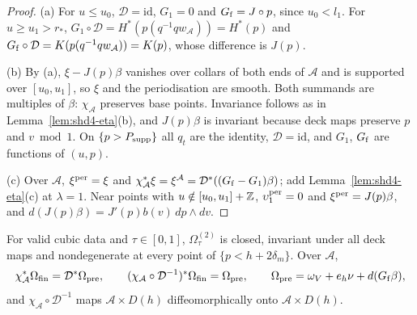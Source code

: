 \begin{proof}
(a) For $u\le u_0$, $\mathcal D=\mathrm{id}$, $G_1=0$ and $G_{\rm f}=J\circ p$, since $u_0<l_1$. For $u\ge u_1>r_*$,
$G_1\circ\mathcal D=H^*(p(q^{-1}qw_{\mathcal A}))=H^*(p)$ and $G_{\rm f}\circ\mathcal D=K(p(q^{-1}qw_{\mathcal A}))=K(p)$, whose difference is $J(p)$.

(b) By (a), $\xi-J(p)\beta$ vanishes over collars of both ends of $\mathcal A$ and is supported over $[u_0,u_1]$, so $\xi$ and
the periodisation are smooth. Both summands are multiples of $\beta$: $\chi_{\mathcal A}$ preserves base points. Invariance
follows as in Lemma~\ref{lem:shd4-eta}(b), and $J(p)\beta$ is invariant because deck maps preserve $p$ and $v\bmod1$. On
$\{p>P_{\rm supp}\}$ all $q_t$ are the identity, $\mathcal D=\mathrm{id}$, and $G_1$, $G_{\rm f}$ are functions of $(u,p)$.

(c) Over $\mathcal A$, $\xi^{\rm per}=\xi$ and $\chi_{\mathcal A}^*\xi=\xi^{\mathcal A}=\mathcal D^*((G_{\rm f}-G_1)\beta)$; add
Lemma~\ref{lem:shd4-eta}(c) at $\lambda=1$. Near points with $u\notin[u_0,u_1]+\mathbb{Z}$, $\upsilon^{\rm per}_1=0$ and $\xi^{\rm per}=J(p)\beta$, and
$d(J(p)\beta)=J'(p)b(v)\,dp\wedge dv$.
\end{proof}

\begin{proposition}\label{prop:shd4-third}
For valid cubic data and $\tau\in[0,1]$, $\Omega^{(2)}_\tau$ is closed, invariant under all deck maps and nondegenerate at every
point of $\{p<h+2\delta_m\}$. Over $\mathcal A$,
\[
 \chi_{\mathcal A}^*\Omega_{\rm fin}=\mathcal D^*\Omega_{\rm pre},\qquad
 (\chi_{\mathcal A}\circ\mathcal D^{-1})^*\Omega_{\rm fin}=\Omega_{\rm pre},\qquad
 \Omega_{\rm pre}=\omega_V+e_h\nu+d(G_{\rm f}\beta),
\]
and $\chi_{\mathcal A}\circ\mathcal D^{-1}$ maps $\mathcal A\times D(h)$ diffeomorphically onto $\mathcal A\times D(h)$.
\end{proposition}

